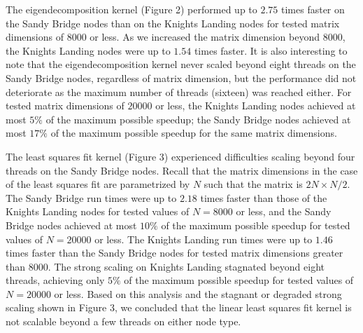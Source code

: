 The eigendecomposition kernel (Figure 2) performed up to $2.75$ times faster on
  the Sandy Bridge nodes than on the Knights Landing nodes for tested matrix
  dimensions of $8000$ or less.
As we increased the matrix dimension beyond $8000$, the Knights Landing nodes
  were up to $1.54$ times faster.
It is also interesting to note that the eigendecomposition kernel never scaled
  beyond eight threads on the Sandy Bridge nodes, regardless of matrix
  dimension, but the performance did not deteriorate as the maximum number of
  threads (sixteen) was reached either.
For tested matrix dimensions of $20000$ or less, the Knights Landing nodes
  achieved at most $5\%$ of the maximum possible speedup; the Sandy Bridge
  nodes achieved at most $17\%$ of the maximum possible speedup for the same
  matrix dimensions.

The least squares fit kernel (Figure 3) experienced difficulties scaling beyond
  four threads on the Sandy Bridge nodes.
Recall that the matrix dimensions in the case of the least squares fit are
  parametrized by $N$ such that the matrix is $2N \times N/2$.
The Sandy Bridge run times were up to $2.18$ times faster than those of the
  Knights Landing nodes for tested values of $N=8000$ or less, and the Sandy
  Bridge nodes achieved at most $10\%$ of the maximum possible speedup for
  tested values of $N=20000$ or less.
The Knights Landing run times were up to $1.46$ times faster than the Sandy
  Bridge nodes for tested matrix dimensions greater than $8000$.
The strong scaling on Knights Landing stagnated beyond eight threads, achieving
  only $5\%$ of the maximum possible speedup for tested values of $N=20000$ or
  less.
Based on this analysis and the stagnant or degraded strong scaling shown in
  Figure 3, we concluded that the linear least squares fit kernel is not
  scalable beyond a few threads on either node type.

